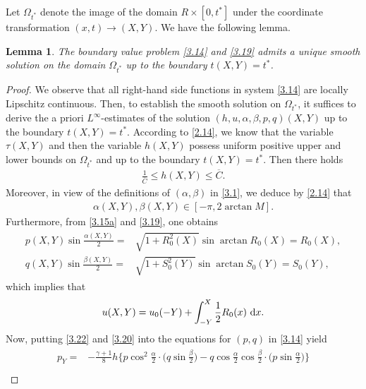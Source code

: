 \documentclass[11pt,reqno]{article}
\newtheorem{lem}{Lemma}
\newcommand{\fr}{\frac}
\numberwithin{equation}{section}
\begin{document}
Let $\Omega_{t^*}$ denote the image of the domain $R\times[0,t^*]$ under the coordinate transformation $(x,t)\rightarrow(X,Y)$. We have the following lemma.
\begin{lem}\label{lem2}
The boundary value problem \eqref{3.14} and \eqref{3.19} admits a unique smooth solution on the domain $\Omega_{t^*}$ up to the boundary $t(X,Y)=t^*$.
\end{lem}
\begin{proof}
We observe that all right-hand side functions in system \eqref{3.14} are locally Lipschitz
continuous. Then, to establish the smooth solution on $\Omega_{t^*}$, it suffices to derive the a priori $L^\infty$-estimates of the solution $(h, u, \alpha, \beta, p, q)(X,Y)$ up to the boundary $t(X,Y)=t^*$.
According to \eqref{2.14}, we know that the variable $\tau(X,Y)$ and then the variable $h(X,Y)$ possess uniform positive upper and lower bounds on $\Omega_{t^*}$ and up to the boundary $t(X,Y)=t^*$. Then there holds
\begin{align}\label{3.20}
\fr{1}{\overline{C}}\leq h(X,Y)\leq \overline{C}.
\end{align}
Moreover, in view of the definitions of $(\alpha, \beta)$ in \eqref{3.1}, we deduce by \eqref{2.14} that
\begin{align}\label{3.21}
\alpha(X,Y),\beta(X,Y)\in[-\pi, 2\arctan M].
\end{align}
Furthermore, from \eqref{3.15a} and \eqref{3.19}, one obtains
\begin{align}\label{3.22}
\begin{split}
p(X,Y)\sin\frac{\alpha(X,Y)}{2}=&\sqrt{1+R_{0}^2(X)}\sin \arctan R_0(X) =R_0(X),\\
q(X,Y)\sin\frac{\beta(X,Y)}{2}=&\sqrt{1+S_{0}^2(Y)}\sin \arctan S_0(Y) =S_0(Y),
\end{split}
\end{align}
which implies that
\begin{align}\label{3.22a}
\begin{split}
u(X,Y)=u_0(-Y)+\int_{-Y}^{X} \fr{1}{2}R_0(x)\ {\rm d}x.
\end{split}
\end{align}
Now, putting \eqref{3.22} and \eqref{3.20} into the equations for $(p,q)$ in \eqref{3.14} yield
\begin{align}\label{3.23}
\begin{split}
p_Y=&-\fr{\gamma+1}{8}h\bigg\{p\cos^2\frac{\alpha}{2}\cdot \Big(q\sin\frac{\beta}{2}\Big) -q\cos\frac{\alpha}{2}\cos\frac{\beta}{2}\cdot \Big(p\sin\frac{\alpha}{2}\Big)\bigg\} \\

\end{split}
\end{align}
\end{proof}
\end{document}
